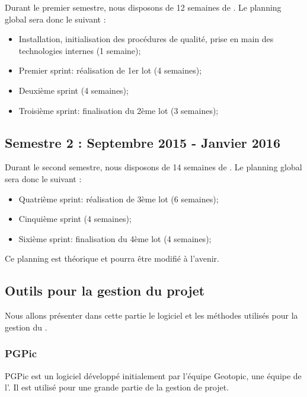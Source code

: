 Durant le premier semestre, nous disposons de 12 semaines de \PICCourt. Le planning global sera donc le suivant : 
\begin{itemize}
\item Installation, initialisation des procédures de qualité, prise en main des technologies internes (1 semaine);
\item Premier sprint: réalisation de 1er lot (4 semaines);
\item Deuxième sprint (4 semaines);
\item Troisième sprint: finalisation du 2ème lot (3 semaines);
\end{itemize}

\subsection*{Semestre 2 : Septembre 2015 - Janvier 2016}

Durant le second semestre, nous disposons de 14 semaines de \PICCourt. Le planning global sera donc le suivant : 
\begin{itemize}
\item Quatrième sprint: réalisation de 3ème lot (6 semaines);
\item Cinquième sprint (4 semaines);
\item Sixième sprint: finalisation du 4ème lot (4 semaines);\\
\end{itemize}

Ce planning est théorique et pourra être modifié à l'avenir. 

\subsection{Outils pour la gestion du projet}
\label{outils_gestion}

Nous allons présenter dans cette partie le logiciel et les méthodes utilisés pour la gestion du \PICCourt. \\

\subsubsection*{PGPic}

PGPic est un logiciel développé initialement par l'équipe Geotopic, une équipe \PICCourt de l'\INSACourt. Il est utilisé pour une grande partie de la gestion de projet. \\

